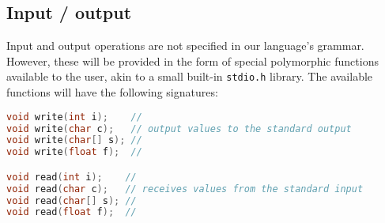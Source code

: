 \subsection{Input / output}
Input and output operations are not specified in our language's grammar. However, these will be provided
in the form of special polymorphic functions available to the user, akin to a small built-in
\texttt{stdio.h} library. The available functions will have the following signatures:

\begin{lstlisting}[language=C]
void write(int i);    //
void write(char c);   // output values to the standard output
void write(char[] s); //
void write(float f);  //

void read(int i);    //
void read(char c);   // receives values from the standard input
void read(char[] s); //
void read(float f);  //
\end{lstlisting}
